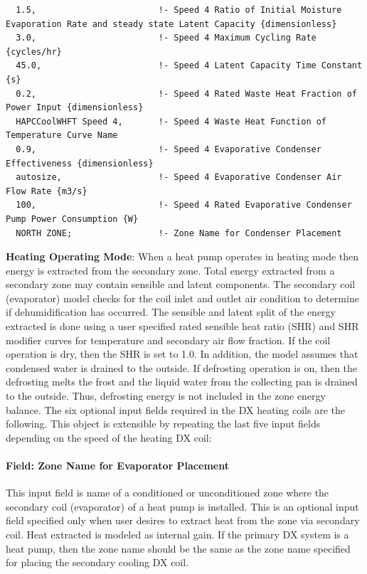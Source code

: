 \begin{lstlisting}
  1.5,                        !- Speed 4 Ratio of Initial Moisture Evaporation Rate and steady state Latent Capacity {dimensionless}
  3.0,                        !- Speed 4 Maximum Cycling Rate {cycles/hr}
  45.0,                       !- Speed 4 Latent Capacity Time Constant {s}
  0.2,                        !- Speed 4 Rated Waste Heat Fraction of Power Input {dimensionless}
  HAPCCoolWHFT Speed 4,       !- Speed 4 Waste Heat Function of Temperature Curve Name
  0.9,                        !- Speed 4 Evaporative Condenser Effectiveness {dimensionless}
  autosize,                   !- Speed 4 Evaporative Condenser Air Flow Rate {m3/s}
  100,                        !- Speed 4 Rated Evaporative Condenser Pump Power Consumption {W}
  NORTH ZONE;                 !- Zone Name for Condenser Placement
\end{lstlisting}

\textbf{Heating Operating Mode}: When a heat pump operates in heating mode then energy is extracted from the secondary zone. Total energy extracted from a secondary zone may contain sensible and latent components. The secondary coil (evaporator) model checks for the coil inlet and outlet air condition to determine if dehumidification has occurred. The sensible and latent split of the energy extracted is done using a user specified rated sensible heat ratio (SHR) and SHR modifier curves for temperature and secondary air flow fraction. If the coil operation is dry, then the SHR is set to 1.0. In addition, the model assumes that condensed water is drained to the outside. If defrosting operation is on, then the defrosting melts the frost and the liquid water from the collecting pan is drained to the outside. Thus, defrosting energy is not included in the zone energy balance. The six optional input fields required in the DX heating coils are the following. This object is extensible by repeating the last five input fields depending on the speed of the heating DX coil:

\paragraph{Field: Zone Name for Evaporator Placement}\label{field-zone-name-for-evaporator-placement-2}

This input field is name of a conditioned or unconditioned zone where the secondary coil (evaporator) of a heat pump is installed. This is an optional input field specified only when user desires to extract heat from the zone via secondary coil. Heat extracted is modeled as internal gain. If the primary DX system is a heat pump, then the zone name should be the same as the zone name specified for placing the secondary cooling DX coil.

